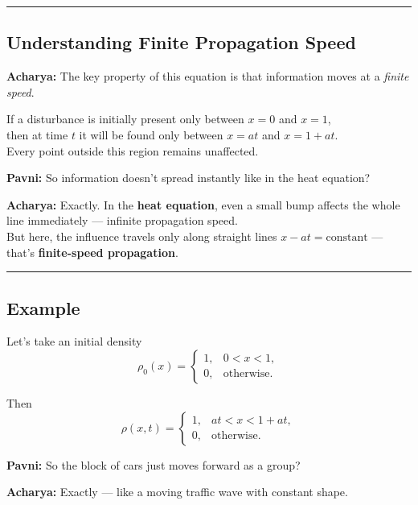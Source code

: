 \documentclass[
  letterpaper,
]{book}
\begin{document}
\begin{center}\rule{0.5\linewidth}{0.5pt}\end{center}

\subsection{Understanding Finite Propagation
Speed}\label{understanding-finite-propagation-speed}

\textbf{Acharya:} The key property of this equation is that information
moves at a \emph{finite speed}.

If a disturbance is initially present only between \(x=0\) and
\(x=1\),\\
then at time \(t\) it will be found only between \(x=a t\) and
\(x=1+a t\).\\
Every point outside this region remains unaffected.

\textbf{Pavni:} So information doesn't spread instantly like in the heat
equation?

\textbf{Acharya:} Exactly. In the \textbf{heat equation}, even a small
bump affects the whole line immediately --- infinite propagation
speed.\\
But here, the influence travels only along straight lines
\(x - a t = \text{constant}\) --- that's \textbf{finite-speed
propagation}.

\begin{center}\rule{0.5\linewidth}{0.5pt}\end{center}

\subsection{Example}\label{example}

Let's take an initial density \[
\rho_0(x) =
\begin{cases}
1, & 0 < x < 1, \\
0, & \text{otherwise}.
\end{cases}
\]

Then \[
\rho(x,t) =
\begin{cases}
1, & a t < x < 1 + a t, \\
0, & \text{otherwise}.
\end{cases}
\]

\textbf{Pavni:} So the block of cars just moves forward as a group?

\textbf{Acharya:} Exactly --- like a moving traffic wave with constant
shape.
\end{document}
